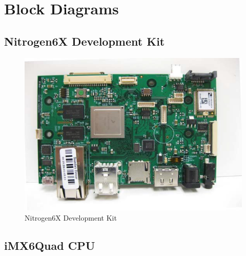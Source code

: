 \chapter{Block Diagrams}
\label{chap:appendix}

\section{Nitrogen6X Development Kit}
\label{app:nitrogen6x}

\begin{figure}[h!]
	\centering
	\includegraphics[]{figures/nitrogen6x}
	\caption{Nitrogen6X Development Kit \cite{nitrogen6x}}
	\label{fig:app:nitrogen6x}
\end{figure}
\newpage

\section{iMX6Quad CPU}
\label{app:imx6q}

